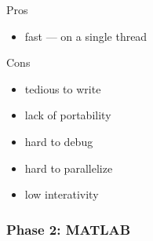\documentclass[
    xcolor={svgnames,dvipsnames},
    hyperref={colorlinks, citecolor=DeepPink4, linkcolor=DarkRed, urlcolor=DarkBlue}
    ]{beamer}  %
\newcommand{\1}{\mathbbm 1}
\begin{document}
\begin{frame}
    

    Pros

    \begin{itemize}
        \item fast  --- on a single thread
    \end{itemize}


    \vspace{0.5em}

    Cons

    \begin{itemize}
        \item tedious to write
        \item lack of portability
        \item hard to debug
        \item hard to parallelize
        \item low interativity
    \end{itemize}

\end{frame}



\begin{frame}
    \frametitle{Phase 2: MATLAB}

    
    \begin{figure}
       \begin{center} %
       \end{center}
    \end{figure}


\end{frame}
\end{document}
